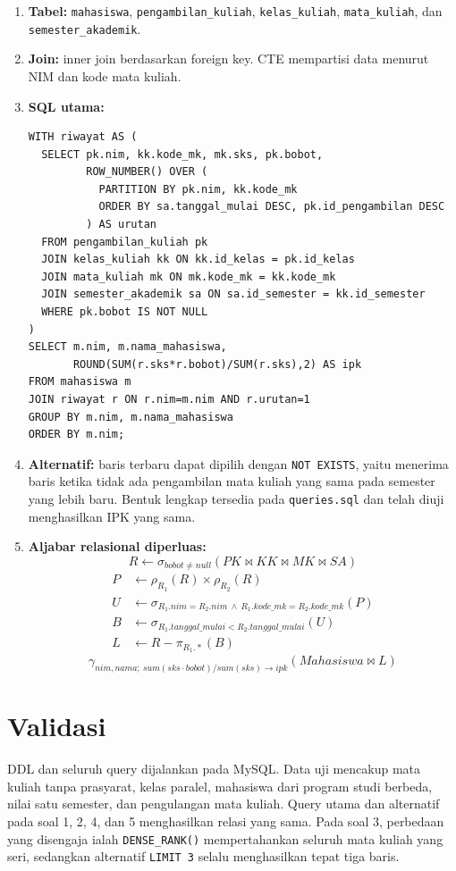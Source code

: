 \begin{enumerate}[noitemsep]
\item \textbf{Tabel:} \texttt{mahasiswa}, \texttt{pengambilan\_kuliah}, \texttt{kelas\_kuliah}, \texttt{mata\_kuliah}, dan \texttt{semester\_akademik}.
\item \textbf{Join:} inner join berdasarkan foreign key. CTE mempartisi data menurut NIM dan kode mata kuliah.
\item \textbf{SQL utama:}
\begin{lstlisting}
WITH riwayat AS (
  SELECT pk.nim, kk.kode_mk, mk.sks, pk.bobot,
         ROW_NUMBER() OVER (
           PARTITION BY pk.nim, kk.kode_mk
           ORDER BY sa.tanggal_mulai DESC, pk.id_pengambilan DESC
         ) AS urutan
  FROM pengambilan_kuliah pk
  JOIN kelas_kuliah kk ON kk.id_kelas = pk.id_kelas
  JOIN mata_kuliah mk ON mk.kode_mk = kk.kode_mk
  JOIN semester_akademik sa ON sa.id_semester = kk.id_semester
  WHERE pk.bobot IS NOT NULL
)
SELECT m.nim, m.nama_mahasiswa,
       ROUND(SUM(r.sks*r.bobot)/SUM(r.sks),2) AS ipk
FROM mahasiswa m
JOIN riwayat r ON r.nim=m.nim AND r.urutan=1
GROUP BY m.nim, m.nama_mahasiswa
ORDER BY m.nim;
\end{lstlisting}
\item \textbf{Alternatif:} baris terbaru dapat dipilih dengan \texttt{NOT EXISTS}, yaitu menerima baris ketika tidak ada pengambilan mata kuliah yang sama pada semester yang lebih baru. Bentuk lengkap tersedia pada \texttt{queries.sql} dan telah diuji menghasilkan IPK yang sama.
\item \textbf{Aljabar relasional diperluas:}
\[
R\leftarrow\sigma_{bobot\ne null}(PK\bowtie KK\bowtie MK\bowtie SA)
\]
\begin{align*}
P&\leftarrow\rho_{R_1}(R)\times\rho_{R_2}(R)\\
U&\leftarrow\sigma_{R_1.nim=R_2.nim\ \wedge\
R_1.kode\_mk=R_2.kode\_mk}(P)\\
B&\leftarrow\sigma_{R_1.tanggal\_mulai<R_2.tanggal\_mulai}(U)\\
L&\leftarrow R-\pi_{R_1.*}(B)
\end{align*}
\[
\gamma_{nim,nama;\ sum(sks\cdot bobot)/sum(sks)\rightarrow ipk}(Mahasiswa\bowtie L)
\]
\end{enumerate}

\section{Validasi}

DDL dan seluruh query dijalankan pada MySQL. Data uji mencakup mata kuliah tanpa prasyarat, kelas paralel, mahasiswa dari program studi berbeda, nilai satu semester, dan pengulangan mata kuliah. Query utama dan alternatif pada soal 1, 2, 4, dan 5 menghasilkan relasi yang sama. Pada soal 3, perbedaan yang disengaja ialah \texttt{DENSE\_RANK()} mempertahankan seluruh mata kuliah yang seri, sedangkan alternatif \texttt{LIMIT 3} selalu menghasilkan tepat tiga baris.

